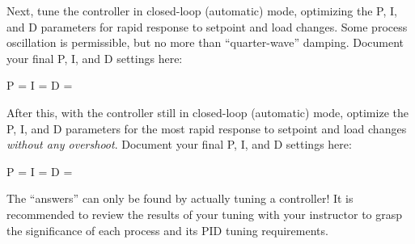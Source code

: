Next, tune the controller in closed-loop (automatic) mode, optimizing the P, I, and D parameters for rapid response to setpoint and load changes.  Some process oscillation is permissible, but no more than ``quarter-wave'' damping.  Document your final P, I, and D settings here:

\vskip 10pt

P = \underbar{\hskip 50pt} \hskip 50pt I = \underbar{\hskip 50pt} \hskip 50pt D = \underbar{\hskip 50pt}

\vskip 20pt

After this, with the controller still in closed-loop (automatic) mode, optimize the P, I, and D parameters for the most rapid response to setpoint and load changes {\it without any overshoot}.  Document your final P, I, and D settings here:

\vskip 10pt

P = \underbar{\hskip 50pt} \hskip 50pt I = \underbar{\hskip 50pt} \hskip 50pt D = \underbar{\hskip 50pt}

\vskip 10pt







The ``answers'' can only be found by actually tuning a controller!  It is recommended to review the results of your tuning with your instructor to grasp the significance of each process and its PID tuning requirements.











